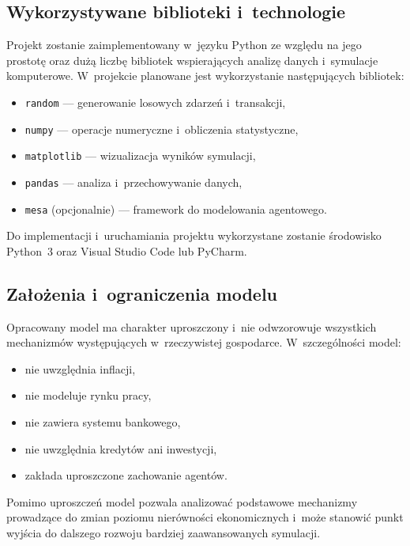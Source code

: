 \documentclass[polish]{projectreport}
\begin{document}
\subsection{Wykorzystywane biblioteki i~technologie}
\label{sec:tech}

Projekt zostanie zaimplementowany w~j\k{e}zyku Python ze wzgl\k{e}du na jego prostot\k{e}
oraz du\.{z}\k{a} liczb\k{e} bibliotek wspieraj\k{a}cych analiz\k{e} danych i~symulacje komputerowe.
W~projekcie planowane jest wykorzystanie nast\k{e}puj\k{a}cych bibliotek:
\begin{itemize}
  \item \texttt{random} --- generowanie losowych zdarze\'n i~transakcji,
  \item \texttt{numpy} --- operacje numeryczne i~obliczenia statystyczne,
  \item \texttt{matplotlib} --- wizualizacja wynik\'ow symulacji,
  \item \texttt{pandas} --- analiza i~przechowywanie danych,
  \item \texttt{mesa} (opcjonalnie) --- framework do modelowania agentowego.
\end{itemize}

Do implementacji i~uruchamiania projektu wykorzystane zostanie \'srodowisko Python~3
oraz Visual Studio Code lub PyCharm.

\subsection{Za\l{}o\.{z}enia i~ograniczenia modelu}
\label{sec:limitations}

Opracowany model ma charakter uproszczony i~nie odwzorowuje wszystkich mechanizm\'ow
wyst\k{e}puj\k{a}cych w~rzeczywistej gospodarce. W~szczeg\'olno\'sci model:
\begin{itemize}
  \item nie uwzgl\k{e}dnia inflacji,
  \item nie modeluje rynku pracy,
  \item nie zawiera systemu bankowego,
  \item nie uwzgl\k{e}dnia kredyt\'ow ani inwestycji,
  \item zak\l{}ada uproszczone zachowanie agent\'ow.
\end{itemize}

Pomimo uproszcze\'n model pozwala analizowa\'{c} podstawowe mechanizmy prowadz\k{a}ce do
zmian poziomu nier\'owno\'sci ekonomicznych i~mo\.{z}e stanowi\'{c} punkt wyj\'scia do dalszego
rozwoju bardziej zaawansowanych symulacji.
\end{document}
